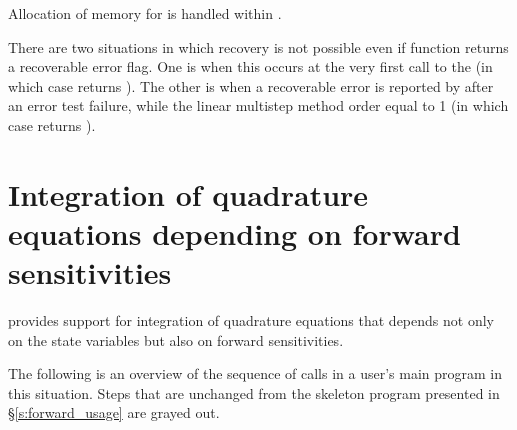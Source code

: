{
  Allocation of memory for  is handled within {\cvodes}.

  There are two situations in which recovery is not possible even if 
  function returns a recoverable error flag.  One is when this occurs
  at the very first call to the  (in which case {\cvodes} returns
  ).  The other is when a recoverable error is reported
  by  after an error test failure, while the linear multistep method
  order  equal to 1 (in which case {\cvodes} returns ).
}



\section{Integration of quadrature equations depending on forward sensitivities}

{\cvodes} provides support for integration of quadrature equations that depends not only 
on the state variables but also on forward sensitivities.

The following is an overview of the sequence of calls in a user's main program in 
this situation. Steps that are unchanged from the skeleton program presented in 
\S\ref{s:forward_usage} are grayed out.

